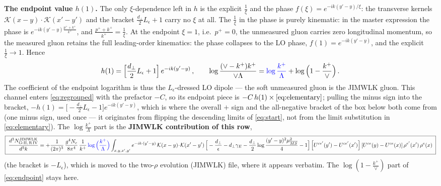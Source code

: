 \documentclass[10pt]{article}
\newcommand{\Leps}{L_{\epsilon}}
\newcommand{\KK}{\mathcal K(x-y)\!\cdot\!\mathcal K(x'-y')}
\newcommand{\Wbr}{\left[U^{ce'}(y') - U^{ce'}(x')\right] \left[U^{ce}(y) - U^{ce}(x)\right] \rho^{e'}(x')\, \rho^{e}(x)}
\begin{document}
\textbf{The endpoint value $h(1)$.} The only $\xi$-dependence left in $h$ is the explicit
$\frac1\xi$ and the phase $f(\xi)=e^{-ik(y'-y)/\xi}$: the transverse kernels
$\mathcal K(x-y)\cdot\mathcal K(x'-y')$ and the bracket $\frac{d_{\perp}}{2}\Leps+1$ carry no
$\xi$ at all. The $\frac1\xi$ in the phase is purely kinematic: in the master expression the
phase is $e^{-ik(y'-y)\frac{p^{+}+k^{+}}{k^{+}}}$, and
$\frac{p^{+}+k^{+}}{k^{+}}=\frac1\xi$. At the endpoint $\xi=1$, i.e.\ $p^{+}=0$, the unmeasured
gluon carries zero longitudinal momentum, so the measured gluon retains the full leading-order
kinematics: the phase collapses to the LO phase, $f(1)=e^{-ik(y'-y)}$, and the explicit
$\frac1\xi\to1$. Hence
\begin{align}\label{eq:endpoint}
h(1)=\Big[\frac{d_{\perp}}{2}\Leps+1\Big]\,e^{-ik(y'-y)}\,,
\qquad
\log\frac{(\vee-k^{+})k^{+}}{\vee\Lambda}
={\color{blue}\log\frac{k^{+}}{\Lambda}}+\log\Big(1-\frac{k^{+}}{\vee}\Big)\,.
\end{align}
The coefficient of the endpoint logarithm is thus the $\Leps$-dressed LO dipole --- the soft
unmeasured gluon is the JIMWLK gluon. This channel enters \eqref{eq:regrouped} with the prefactor
$-C$, so its endpoint piece is $-C\,h(1)\times\eqref{eq:elementary}$; pulling the minus sign into
the bracket, $-h(1)=\big[-\frac{d_{\perp}}{2}\Leps-1\big]e^{-ik(y'-y)}$, which is where the
overall $+$ sign and the all-negative bracket of the box below both come from (one minus sign,
used once --- it originates from flipping the descending limits of \eqref{eq:start}, not from the
limit substitution in \eqref{eq:elementary}). The $\log\frac{k^{+}}{\Lambda}$ part is the
\textbf{JIMWLK contribution of this row},
\begin{align}\label{eq:jimwlk}
\boxed{\;\frac{d^{3}N^{\rm JIMWLK}_{\rm G\text{-}II,\,R\,IV}}{d^{3}k}
= + \frac{1}{(2\pi)^{3}}\,\frac{g^{4}N_{c}}{8\pi^{4}}\, \frac{1}{k^{+}}\,{\color{blue}\log\Big(\frac{k^{+}}{\Lambda}\Big)}\int_{x,y,x',y'}e^{-ik\cdot (y'-y)}\,\KK\,
\Big[-\frac{d_{\perp}}{\epsilon}-d_{\perp}\gamma_{E}-\frac{d_{\perp}}{2}\log\frac{(y'-y)^{2}\mu^{2}_{\overline{MS}}}{4}-1\Big]\Wbr\;}
\end{align}
(the bracket is $-\Leps$), which is moved to the two-$\rho$ evolution (JIMWLK) file, where it
appears verbatim. The $\log(1-\frac{k^{+}}{\vee})$ part of \eqref{eq:endpoint} stays here.
\end{document}
